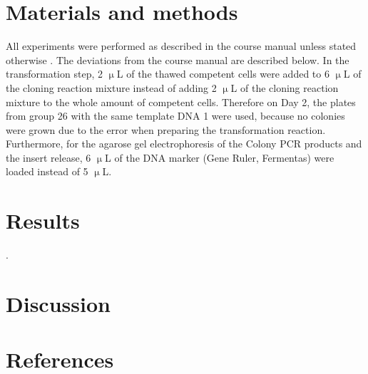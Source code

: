 \documentclass[a4paper,12pt,bibliography=totocnumbered,parskip=half,headsepline]{scrartcl}
\begin{document}
\section{Materials and methods}
All experiments were performed as described in the course manual unless stated otherwise \parencite{Skript}.
The deviations from the course manual are described below.
In the transformation step, 2 $\upmu$L of the thawed competent cells were added to 6 $\upmu$L of the cloning reaction mixture instead of adding 2 $\upmu$L of the cloning reaction mixture to the whole amount of competent cells.
Therefore on Day 2, the plates from group 26 with the same template DNA 1 were used, because no colonies were grown due to the error when preparing the transformation reaction.
Furthermore, for the agarose gel electrophoresis of the Colony PCR products and the insert release, 6 $\upmu$L of the DNA marker (Gene Ruler, Fermentas) were loaded instead of 5 $\upmu$L.

\newpage

\section{Results}


\parencite{Ratios}.

\section{Discussion}



\newpage

\section{References}
\printbibliography[nottype=online, heading=subbibliography, title={Books and Articles}]
\printbibliography[type=online, heading=subbibliography, title={Internet Sources}]
\end{document}
